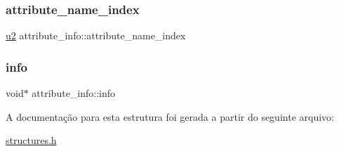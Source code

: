 \subsubsection{\texorpdfstring{attribute\+\_\+name\+\_\+index}{attribute\_name\_index}}
{\footnotesize\ttfamily \hyperlink{lista__operandos_8h_a732cde1300aafb73b0ea6c2558a7a54f}{u2} attribute\+\_\+info\+::attribute\+\_\+name\+\_\+index}

\mbox{\label{structattribute__info_a7f168925308e418b7b44c9f11fdf42ae}} 
\subsubsection{\texorpdfstring{info}{info}}
{\footnotesize\ttfamily void$\ast$ attribute\+\_\+info\+::info}



A documentação para esta estrutura foi gerada a partir do seguinte arquivo\+:\begin{DoxyCompactItemize}
\item 
\hyperlink{structures_8h}{structures.\+h}\end{DoxyCompactItemize}
